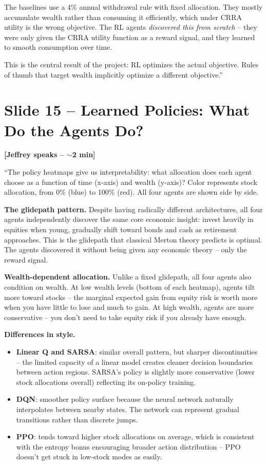 \documentclass[11pt, letterpaper]{article}
\begin{document}
The baselines use a 4\% annual withdrawal rule with fixed allocation. They mostly accumulate wealth rather than consuming it efficiently, which under CRRA utility is the wrong objective. The RL agents \emph{discovered this from scratch} -- they were only given the CRRA utility function as a reward signal, and they learned to smooth consumption over time.

This is the central result of the project: RL optimizes the actual objective. Rules of thumb that target wealth implicitly optimize a different objective.''

\section{Slide 15 -- Learned Policies: What Do the Agents Do?}

\textbf{[Jeffrey speaks -- $\sim$2 min]}

``The policy heatmaps give us interpretability: what allocation does each agent choose as a function of time (x-axis) and wealth (y-axis)? Color represents stock allocation, from 0\% (blue) to 100\% (red). All four agents are shown side by side.

\textbf{The glidepath pattern.} Despite having radically different architectures, all four agents independently discover the same core economic insight: invest heavily in equities when young, gradually shift toward bonds and cash as retirement approaches. This is the glidepath that classical Merton theory predicts is optimal. The agents discovered it without being given any economic theory -- only the reward signal.

\textbf{Wealth-dependent allocation.} Unlike a fixed glidepath, all four agents also condition on wealth. At low wealth levels (bottom of each heatmap), agents tilt more toward stocks -- the marginal expected gain from equity risk is worth more when you have little to lose and much to gain. At high wealth, agents are more conservative -- you don't need to take equity risk if you already have enough.

\textbf{Differences in style.}
\begin{itemize}
\item \textbf{Linear Q and SARSA}: similar overall pattern, but sharper discontinuities -- the limited capacity of a linear model creates cleaner decision boundaries between action regions. SARSA's policy is slightly more conservative (lower stock allocations overall) reflecting its on-policy training.
\item \textbf{DQN}: smoother policy surface because the neural network naturally interpolates between nearby states. The network can represent gradual transitions rather than discrete jumps.
\item \textbf{PPO}: tends toward higher stock allocations on average, which is consistent with the entropy bonus encouraging broader action distribution -- PPO doesn't get stuck in low-stock modes as easily.
\end{itemize}
\end{document}
